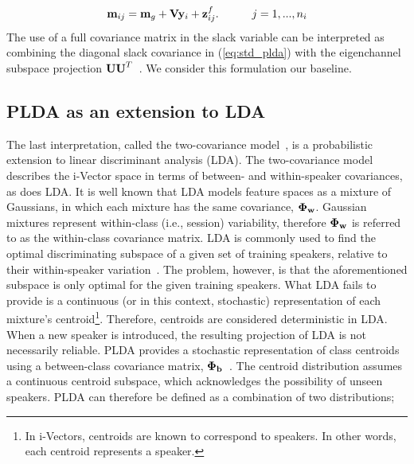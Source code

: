 \begin{equation}
\label{eq:simple_plda}
{\bf m}_{ij} = {\bf m}_g + {\bf V}{\bf y}_i+{\bf z}^f_{ij}.  \hspace{30pt} j=1,...,n_i
\end{equation}
The use of a full covariance matrix in the slack variable can be interpreted as combining the diagonal slack covariance in (\ref{eq:std_plda}) with the eigenchannel subspace projection ${\bf UU}^T$~\cite{sizov2014unifying}.
We consider this formulation our baseline. 

\subsection{PLDA as an extension to LDA}
\label{sec:twocov}
The last interpretation, called the two-covariance model~\cite{sizov2014unifying}, is a probabilistic extension to linear discriminant analysis (LDA). 
The two-covariance model describes the i-Vector space in terms of between- and within-speaker covariances, as does LDA. 
It is well known that LDA models feature spaces as a mixture of Gaussians, in which each mixture has the same covariance, ${\bf \Phi_w}$. 
Gaussian mixtures represent within-class (i.e., session) variability, therefore ${\bf \Phi_w}$ is referred to as the within-class covariance matrix. 
LDA is commonly used to find the optimal discriminating subspace of a given set of training speakers, relative to their within-speaker variation~\cite{ioffePLDA2006}. 
The problem, however, is that the aforementioned subspace is only optimal for the given training speakers. 
What LDA fails to provide is a continuous (or in this context, stochastic) representation of each mixture's centroid\footnote{In i-Vectors, centroids are known to correspond to speakers. In other words, each centroid represents a speaker.}. 
Therefore, centroids are considered deterministic in LDA. 
When a new speaker is introduced, the resulting projection of LDA is not necessarily reliable. 
PLDA provides a stochastic representation of class centroids using a between-class covariance matrix, ${\bf \Phi_b}$~\cite{ioffePLDA2006}. 
The centroid distribution assumes a continuous centroid subspace, which acknowledges the possibility of unseen speakers. 
PLDA can therefore be defined as a combination of two distributions; 
